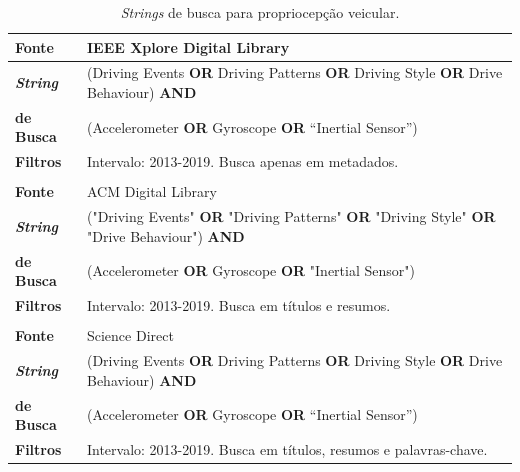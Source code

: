 \begin{table}[h!]
    \caption{\textit{Strings} de busca para propriocepção veicular.}
    \label{tabela:propriocepcao_busca}
    \centering
    \small
    \begin{tabular}{l l}
        
        \toprule
        \textbf{Fonte} & IEEE Xplore Digital Library \\
        \toprule
        \textbf{\textit{String}} & (Driving Events \textbf{OR} Driving Patterns \textbf{OR} Driving Style \textbf{OR} Drive Behaviour) \textbf{AND} \\ \textbf{de Busca} & (Accelerometer \textbf{OR} Gyroscope \textbf{OR} “Inertial Sensor”) \\
        \toprule
        \textbf{Filtros} & Intervalo: 2013-2019. Busca apenas em metadados. \\
        \bottomrule
        
        \\
        
        \toprule
        \textbf{Fonte} & ACM Digital Library \\
        \toprule
        \textbf{\textit{String}} & ("Driving Events" \textbf{OR} "Driving Patterns" \textbf{OR} "Driving Style" \textbf{OR} "Drive Behaviour")  \textbf{AND}  \\ \textbf{de Busca} & (Accelerometer \textbf{OR} Gyroscope \textbf{OR} "Inertial Sensor") \\
        \toprule
        \textbf{Filtros} & Intervalo: 2013-2019.  Busca em títulos e resumos. \\
        \bottomrule
         
         \\
         
        \toprule
        \textbf{Fonte} & Science Direct \\
        \toprule
        \textbf{\textit{String}} & (Driving Events \textbf{OR} Driving Patterns \textbf{OR} Driving Style \textbf{OR}  Drive Behaviour) \textbf{AND} \\ \textbf{de Busca} & (Accelerometer \textbf{OR} Gyroscope \textbf{OR} “Inertial Sensor”) \\
        \toprule
        \textbf{Filtros} & Intervalo: 2013-2019. Busca em títulos, resumos e palavras-chave. \\
        \bottomrule
        
    \end{tabular}
\end{table}

